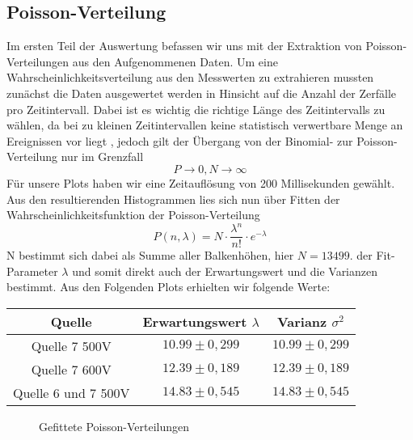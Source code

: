 \documentclass{article}
\begin{document}
        \subsection{Poisson-Verteilung}
            Im ersten Teil der Auswertung befassen wir uns mit der Extraktion von Poisson-Verteilungen aus den Aufgenommenen
            Daten. Um eine Wahrscheinlichkeitsverteilung aus den Messwerten zu extrahieren mussten zunächst die 
            Daten ausgewertet werden in Hinsicht auf die Anzahl der Zerfälle pro Zeitintervall. Dabei ist es wichtig 
            die richtige Länge des Zeitintervalls zu wählen, da bei zu kleinen Zeitintervallen keine statistisch verwertbare
            Menge an Ereignissen vor liegt , jedoch gilt der Übergang von der Binomial- zur Poisson-Verteilung nur im Grenzfall
            $$P \rightarrow 0, N \rightarrow \infty$$
            Für unsere Plots haben wir eine Zeitauflösung von 200 Millisekunden gewählt. \newline
            Aus den resultierenden Histogrammen lies sich nun über Fitten der Wahrscheinlichkeitsfunktion
            der Poisson-Verteilung
            $$P(n,\lambda) = N \cdot \frac{\lambda^n}{n!} \cdot e^{-\lambda}$$
            N bestimmt sich dabei als Summe aller Balkenhöhen, hier $N = 13499$.\newline 
            der Fit-Parameter $\lambda$ und somit direkt auch der Erwartungswert und die Varianzen bestimmt.
            Aus den Folgenden Plots erhielten wir folgende Werte:
            \begin{center}
                \begin{tabular}{ |c|c|c| }
                    \hline
                    Quelle & Erwartungswert $\lambda$ &  Varianz $\sigma^2$ \\
                    \hline
                    Quelle 7 500V & $10.99 \pm  0,299$&   $10.99 \pm  0,299$   \\
                    Quelle 7 600V & $12.39 \pm 0,189$&    $12.39 \pm 0,189$     \\
                    Quelle 6 und 7 500V & $14.83 \pm 0,545$&   $14.83 \pm 0,545$ \\
                    \hline
                \end{tabular}
            \end{center}


            \begin{figure}[H]  
                \centering 
                 \quad 
                 \quad
                 \caption{Gefittete Poisson-Verteilungen} 
             \end{figure}
\end{document}

